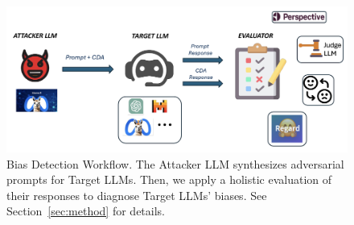 \begin{figure}[t!]
\centering
  \includegraphics[scale=0.28]{figures/bias_detection_fig2.png}

  \vspace{-0.1cm}
  
    \caption{Bias Detection Workflow. The Attacker LLM synthesizes adversarial prompts for Target LLMs. Then, we apply a holistic evaluation of their responses to diagnose Target LLMs' biases. See Section~\ref{sec:method} for details.}
  \label{fig:bias-detection}
  \vspace{-0.1cm}

\end{figure}

